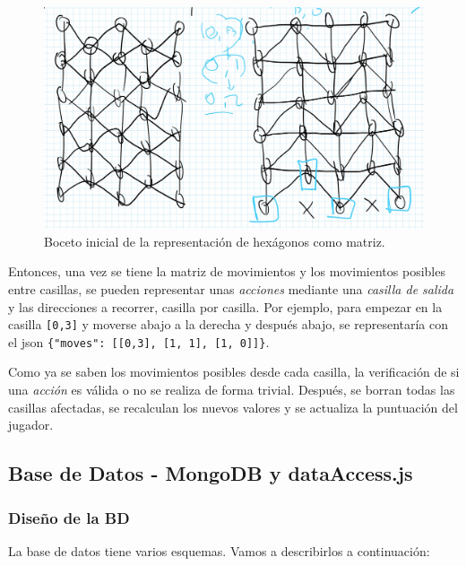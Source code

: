 \documentclass[12pt,epsf,titlepage,a4paper]{article}
\begin{document}
\begin{figure}[h]
  \centering
  \includegraphics[scale=0.17]{img/boceto.jpeg}
  \caption{Boceto inicial de la representación de hexágonos como matriz.}
  \label{fig:bocetohexa}
\end{figure}


Entonces, una vez se tiene la matriz de movimientos y los movimientos posibles entre casillas, se pueden representar unas \emph{acciones} mediante una \emph{casilla de salida} y las direcciones a recorrer, casilla por casilla. Por ejemplo, para empezar en la casilla \verb|[0,3]| y moverse abajo a la derecha y después abajo, se representaría con el json \verb|{"moves": [[0,3], [1, 1], [1, 0]]}|.

Como ya se saben los movimientos posibles desde cada casilla, la verificación de si una \emph{acción} es válida o no se realiza de forma trivial. Después, se borran todas las casillas afectadas, se recalculan los nuevos valores y se actualiza la puntuación del jugador.


\subsection{Base de Datos - MongoDB y dataAccess.js}

\subsubsection{Diseño de la BD}

La base de datos tiene varios esquemas. Vamos a describirlos a continuación:
\end{document}
